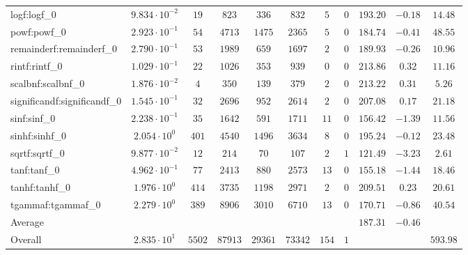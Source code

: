 \begin{tabular}{|l|c|c|c|c|c|c|c|c|c|c|}
logf:logf\_0                 & $ 9.834 \cdot 10^{-2} $ & $ 19     $ & $ 823   $ & $ 336   $ & $ 832   $ & $ 5   $ & $ 0 $ & $ 193.20      $ & $ -0.18   $ & $ 14.48   $ \\
powf:powf\_0                 & $ 2.923 \cdot 10^{-1} $ & $ 54     $ & $ 4713  $ & $ 1475  $ & $ 2365  $ & $ 5   $ & $ 0 $ & $ 184.74      $ & $ -0.41   $ & $ 48.55   $ \\
remainderf:remainderf\_0     & $ 2.790 \cdot 10^{-1} $ & $ 53     $ & $ 1989  $ & $ 659   $ & $ 1697  $ & $ 2   $ & $ 0 $ & $ 189.93      $ & $ -0.26   $ & $ 10.96   $ \\
rintf:rintf\_0               & $ 1.029 \cdot 10^{-1} $ & $ 22     $ & $ 1026  $ & $ 353   $ & $ 939   $ & $ 0   $ & $ 0 $ & $ 213.86      $ & $ 0.32    $ & $ 11.16   $ \\
scalbnf:scalbnf\_0           & $ 1.876 \cdot 10^{-2} $ & $ 4      $ & $ 350   $ & $ 139   $ & $ 379   $ & $ 2   $ & $ 0 $ & $ 213.22      $ & $ 0.31    $ & $ 5.26    $ \\
significandf:significandf\_0 & $ 1.545 \cdot 10^{-1} $ & $ 32     $ & $ 2696  $ & $ 952   $ & $ 2614  $ & $ 2   $ & $ 0 $ & $ 207.08      $ & $ 0.17    $ & $ 21.18   $ \\
sinf:sinf\_0                 & $ 2.238 \cdot 10^{-1} $ & $ 35     $ & $ 1642  $ & $ 591   $ & $ 1711  $ & $ 11  $ & $ 0 $ & $ 156.42      $ & $ -1.39   $ & $ 11.56   $ \\
sinhf:sinhf\_0               & $ 2.054 \cdot 10^{0}  $ & $ 401    $ & $ 4540  $ & $ 1496  $ & $ 3634  $ & $ 8   $ & $ 0 $ & $ 195.24      $ & $ -0.12   $ & $ 23.48   $ \\
sqrtf:sqrtf\_0               & $ 9.877 \cdot 10^{-2} $ & $ 12     $ & $ 214   $ & $ 70    $ & $ 107   $ & $ 2   $ & $ 1 $ & $ 121.49      $ & $ -3.23   $ & $ 2.61    $ \\
tanf:tanf\_0                 & $ 4.962 \cdot 10^{-1} $ & $ 77     $ & $ 2413  $ & $ 880   $ & $ 2573  $ & $ 13  $ & $ 0 $ & $ 155.18      $ & $ -1.44   $ & $ 18.46   $ \\
tanhf:tanhf\_0               & $ 1.976 \cdot 10^{0}  $ & $ 414    $ & $ 3735  $ & $ 1198  $ & $ 2971  $ & $ 2   $ & $ 0 $ & $ 209.51      $ & $ 0.23    $ & $ 20.61   $ \\
tgammaf:tgammaf\_0           & $ 2.279 \cdot 10^{0}  $ & $ 389    $ & $ 8906  $ & $ 3010  $ & $ 6710  $ & $ 13  $ & $ 0 $ & $ 170.71      $ & $ -0.86   $ & $ 40.54   $ \\
\hline
Average                      & $                     $ & $        $ & $       $ & $       $ & $       $ & $     $ & $   $ & $ 187.31      $ & $ -0.46   $ & $         $ \\
\hline
Overall                      & $ 2.835 \cdot 10^{1}  $ & $ 5502   $ & $ 87913 $ & $ 29361 $ & $ 73342 $ & $ 154 $ & $ 1 $ & $             $ & $         $ & $ 593.98  $ \\
\hline
\end{tabular}
